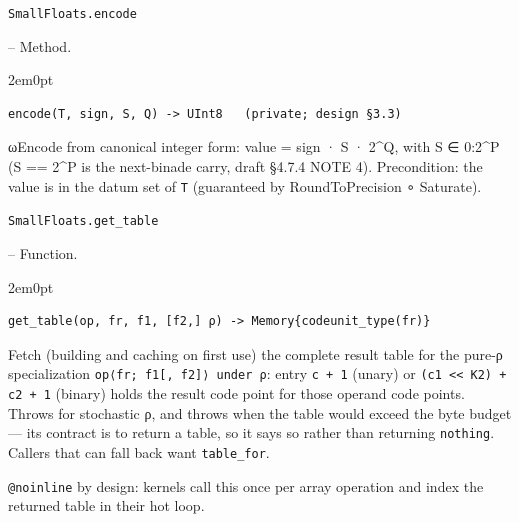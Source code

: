 \par\medskip\noindent\begin{minipage}{\linewidth}
\hypertarget{9355066705305247355}{\texttt{SmallFloats.encode}}  -- {Method.}
\nopagebreak
\begin{adjustwidth}{2em}{0pt}


\begin{verbatim}
encode(T, sign, S, Q) -> UInt8   (private; design §3.3)
\end{verbatim}

ωEncode from canonical integer form: value = sign · S · 2{\textasciicircum}Q, with S ∈ 0:2{\textasciicircum}P (S == 2{\textasciicircum}P is the next-binade carry, draft §4.7.4 NOTE 4). Precondition: the value is in the datum set of \texttt{T} (guaranteed by RoundToPrecision ∘ Saturate).



\end{adjustwidth}
\end{minipage}
\par\medskip

\par\medskip\noindent\begin{minipage}{\linewidth}
\hypertarget{16293177486057421760}{\texttt{SmallFloats.get\_\allowbreak{}table}}  -- {Function.}
\nopagebreak
\begin{adjustwidth}{2em}{0pt}


\begin{verbatim}
get_table(op, fr, f1, [f2,] ρ) -> Memory{codeunit_type(fr)}
\end{verbatim}

Fetch (building and caching on first use) the complete result table for the pure-ρ specialization \texttt{op⟨fr; f1[, f2]⟩ under ρ}: entry \texttt{c + 1} (unary) or \texttt{(c1 << K2) + c2 + 1} (binary) holds the result code point for those operand code points. Throws for stochastic ρ, and throws when the table would exceed the byte budget — its contract is to return a table, so it says so rather than returning \texttt{nothing}. Callers that can fall back want \texttt{table\_\allowbreak{}for}.

\texttt{@noinline} by design: kernels call this once per array operation and index the returned table in their hot loop.



\end{adjustwidth}
\end{minipage}
\par\medskip

